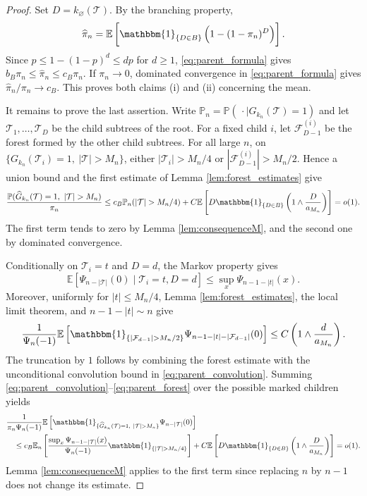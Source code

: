 \documentclass[a4paper,11pt]{article}
\newcommand{\E}{\mathbb{E}}
\DeclareRobustCommand{\P}{\mathbb{P}}
\DeclareRobustCommand{\1}{\mathbf{1}}
\begin{document}
\begin{proof}
Set $D=k_\varnothing(\mathcal T)$. By the branching property,
\begin{equation}
\label{eq:parent_formula}
\widehat\pi_n
=\E\left[\mathbbm{1}_{\{D\in B\}}
\left(1-(1-\pi_n)^D\right)\right].
\end{equation}
Since $p\le1-(1-p)^d\le dp$ for $d\ge1$,
\eqref{eq:parent_formula} gives
$b_B\pi_n\le\widehat\pi_n\le c_B\pi_n$. If $\pi_n\to0$, dominated
convergence in \eqref{eq:parent_formula} gives $\widehat\pi_n/\pi_n\to c_B$. This proves both
claims (i) and (ii) concerning the mean.

It remains to prove the last assertion. Write
$\P_n=\P(\,\cdot\mid G_{k_n}(\mathcal T)=1)$ and let
$\mathcal T_1,\ldots,\mathcal T_D$ be the child subtrees of the root.
For a fixed child $i$, let $\mathcal F_{D-1}^{(i)}$ be the forest formed by
the other child subtrees. For all large $n$, on
$\{G_{k_n}(\mathcal T_i)=1,\ |\mathcal T|>M_n\}$, either
$|\mathcal T_i|>M_n/4$ or
$|\mathcal F_{D-1}^{(i)}|>M_n/2$. Hence a union bound and the first estimate
of Lemma \ref{lem:forest_estimates} give
\begin{equation}
\frac{\P(\widehat G_{k_n}(\mathcal T)=1,\ |\mathcal T|>M_n)}{\pi_n}\le c_B\P_n(|\mathcal T|>M_n/4)
+C\E\left[
D\mathbbm{1}_{\{D\in B\}}
\left(1\wedge\frac{D}{a_{M_n}}\right)\right]=o(1).
\label{eq:parent_unweighted}
\end{equation}
The first term tends to zero by Lemma \ref{lem:consequenceM}, and the second
one by dominated convergence.

Conditionally on $\mathcal T_i=t$ and $D=d$, the Markov property gives
\begin{equation}
\label{eq:parent_convolution}
\E\left[\Psi_{n-|\mathcal T|}(0)\mid\mathcal T_i=t,D=d\right]
\le \sup_x\Psi_{n-1-|t|}(x).
\end{equation}
Moreover, uniformly for $|t|\le M_n/4$, Lemma
\ref{lem:forest_estimates}, the local limit theorem, and
$n-1-|t|\sim n$ give
\begin{equation}
\label{eq:parent_forest}
\frac{1}{\Psi_n(-1)}
\E\left[
\mathbbm{1}_{\{|\mathcal F_{d-1}|>M_n/2\}}
\Psi_{n-1-|t|-|\mathcal F_{d-1}|}(0)
\right]
\le C\left(1\wedge\frac{d}{a_{M_n}}\right).
\end{equation}
The truncation by $1$ follows by combining the forest estimate with
the unconditional convolution bound in \eqref{eq:parent_convolution}.
Summing \eqref{eq:parent_convolution}--\eqref{eq:parent_forest} over
the possible marked children yields
\begin{align}
&\frac{1}{\pi_n\Psi_n(-1)}
\E\left[
\mathbbm{1}_{\{\widehat G_{k_n}(\mathcal T)=1,\ |\mathcal T|>M_n\}}
\Psi_{n-|\mathcal T|}(0)\right]\notag\\
&\quad\le
c_B\E_n\left[
\frac{\sup_x\Psi_{n-1-|\mathcal T|}(x)}{\Psi_n(-1)}
\mathbbm{1}_{\{|\mathcal T|>M_n/4\}}\right]+C\E\left[
D\mathbbm{1}_{\{D\in B\}}
\left(1\wedge\frac{D}{a_{M_n}}\right)\right]
=o(1).
\label{eq:parent_bridge}
\end{align}
Lemma \ref{lem:consequenceM} applies to the first term since replacing
$n$ by $n-1$ does not change its estimate.


\end{proof}
\end{document}
